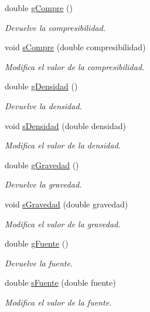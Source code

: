 \begin{DoxyCompactItemize}
double \hyperlink{class_c_v_f_e_m_a15cff377e25050b87b01b859330e1334}{g\+Compre} ()
\begin{DoxyCompactList}\small\item\em Devuelve la compresibilidad. \end{DoxyCompactList}\item 
void \hyperlink{class_c_v_f_e_m_ac60363ea7805dbb4a8c3d42b5d849bba}{s\+Compre} (double compresibilidad)
\begin{DoxyCompactList}\small\item\em Modifica el valor de la compresibilidad. \end{DoxyCompactList}\item 
double \hyperlink{class_c_v_f_e_m_a7b896f4031aad73d3f6369b8eeb1fb2e}{g\+Densidad} ()
\begin{DoxyCompactList}\small\item\em Devuelve la densidad. \end{DoxyCompactList}\item 
void \hyperlink{class_c_v_f_e_m_ae28f0a371ddc5ae1728bf26c31762364}{s\+Densidad} (double densidad)
\begin{DoxyCompactList}\small\item\em Modifica el valor de la densidad. \end{DoxyCompactList}\item 
double \hyperlink{class_c_v_f_e_m_a83309ce392473cd4d5bb2e1290aac2cf}{g\+Gravedad} ()
\begin{DoxyCompactList}\small\item\em Devuelve la gravedad. \end{DoxyCompactList}\item 
void \hyperlink{class_c_v_f_e_m_aa8c7083144c757b4cc59bdaab84c6c0b}{s\+Gravedad} (double gravedad)
\begin{DoxyCompactList}\small\item\em Modifica el valor de la gravedad. \end{DoxyCompactList}\item 
double \hyperlink{class_c_v_f_e_m_a5b763bad3cf2dd5d62b9c54d6d98dac6}{g\+Fuente} ()
\begin{DoxyCompactList}\small\item\em Devuelve la fuente. \end{DoxyCompactList}\item 
double \hyperlink{class_c_v_f_e_m_a2c3c174843a173f1419c41963e1d8f1f}{s\+Fuente} (double fuente)
\begin{DoxyCompactList}\small\item\em Modifica el valor de la fuente. \end{DoxyCompactList}\item 

\end{DoxyCompactItemize}
